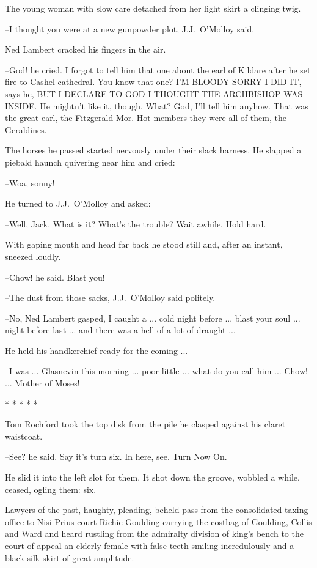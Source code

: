 The young woman with slow care
detached from her light skirt a clinging twig.

--I thought you were at a new gunpowder plot, J.J.~O'Molloy said.

Ned Lambert cracked his fingers in the air.

--God! he cried. I forgot to tell him that one about the earl of Kildare
after he set fire to Cashel cathedral. You know that one? I'M BLOODY SORRY
I DID IT, says he, BUT I DECLARE TO GOD I THOUGHT THE ARCHBISHOP WAS
INSIDE. He mightn't like it, though. What? God, I'll tell him anyhow.
That was the great earl, the Fitzgerald Mor. Hot members they were all of
them, the Geraldines.

The horses he passed started nervously
under their slack harness.
He slapped a piebald haunch quivering near him and cried:

--Woa, sonny!

He turned to J.J.~O'Molloy and asked:

--Well, Jack. What is it? What's the trouble? Wait awhile. Hold hard.

With gaping mouth and head far back he stood still and, after an
instant, sneezed loudly.

--Chow! he said. Blast you!

--The dust from those sacks, J.J.~O'Molloy said politely.

--No,
Ned Lambert gasped,
I caught a ...
cold night before ...
blast your soul ...
night before last ...
and there was a hell of a lot of draught ...

He held his handkerchief ready for the coming ...

--I was ...
Glasnevin this morning ...
poor little ...
what do you call him ...
Chow! ...
Mother of Moses!


    * * * * *


Tom Rochford took the top disk from the pile
he clasped against his claret waistcoat.

--See?
he said.
Say it's turn six.
In here, see.
Turn Now On.

He slid it into the left slot for them.
It shot down the groove,
wobbled a while,
ceased,
ogling them:
six.

Lawyers of the past, haughty, pleading,
beheld pass from the
consolidated taxing office to Nisi Prius court Richie Goulding carrying
the costbag of Goulding, Collis and Ward and heard rustling from the
admiralty division of king's bench to the court of appeal an elderly
female with false teeth smiling incredulously and a black silk skirt of
great amplitude.

